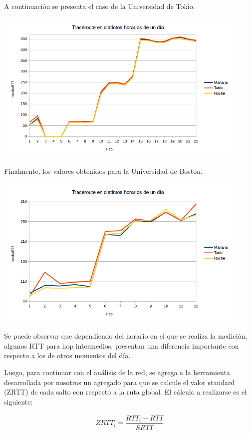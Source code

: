 A continuación se presenta el caso de la Universidad de Tokio.

\centerline{\includegraphics[width=0.9\textwidth]{imagenes/1ra_parte/trace_distintos_horarios_japon.png}}

Finalmente, los valores obtenidos para la Universidad de Boston. 

\centerline{\includegraphics[width=0.9\textwidth]{imagenes/1ra_parte/trace_distintos_horarios_eeuu.png}}

Se puede observar que dependiendo del horario en el que se realiza la medición, algunos RTT para hop intermedios, presentan una diferencia importante con respecto a los de otros momentos del día. 


Luego, para continuar con el análisis de la red, se agrega a la herramienta desarrollada por nosotros un agregado para que se calcule el valor standard (ZRTT) de cada salto con respecto a la ruta global. El cálculo a realizarse es el siguiente:

 \begin{equation}
 	ZRTT_i = \frac{RTT_i - \overline{RTT}}{SRTT} 
 \end{equation}

